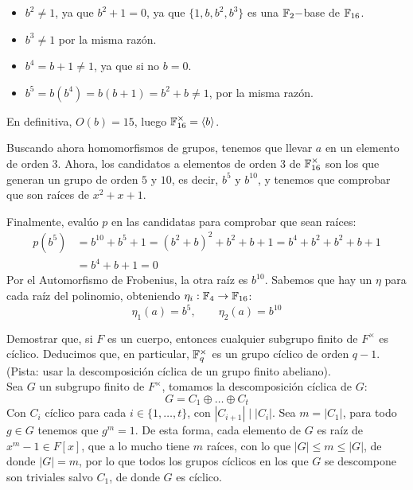 \begin{ejercicio}
    \begin{itemize}
        \item $b^2\neq 1$, ya que $b^2+1=0$, ya que $\{1,b,b^2, b^3\}$ es una $\mathbb{F}_2-$base de $\mathbb{F}_{16}$.
        \item $b^3\neq 1$ por la misma razón.
        \item $b^4 = b+1\neq 1$, ya que si no $b = 0$.
        \item $b^5 = b(b^4) = b(b+1) = b^2 + b \neq 1$, por la misma razón.
    \end{itemize}
    En definitiva, $O(b)=15$, luego $\mathbb{F}_{16}^{\times} = \langle b \rangle $.

    \noindent
    Buscando ahora homomorfismos de grupos, tenemos que llevar $a$ en un elemento de orden 3. Ahora, los candidatos a elementos de orden 3 de $\mathbb{F}_{16}^\times$ son los que generan un grupo de orden $5$ y $10$, es decir, $b^5$ y $b^{10}$, y tenemos que comprobar que son raíces de $x^2+x+1$.

    Finalmente, evalúo $p$ en las candidatas para comprobar que sean raíces:
    \begin{align*}
        p(b^5) &= b^{10} + b^{5} + 1 = {(b^2 + b)}^{2} + b^2 + b + 1 = b^4 + b^2 + b^2 + b + 1 \\
               &= b^4 + b + 1 = 0 
    \end{align*}
    Por el Automorfismo de Frobenius, la otra raíz es $b^{10}$. Sabemos que hay un $\eta$ para cada raíz del polinomio, obteniendo $\eta_i:\mathbb{F}_4\to \mathbb{F}_{16}$:
    \begin{equation*}
        \eta_1(a) = b^5, \qquad \eta_2(a) = b^{10}
    \end{equation*}
\end{ejercicio}


\begin{ejercicio}\label{ej:subgrupo_finito}
    Demostrar que, si $F$ es un cuerpo, entonces cualquier subgrupo finito de $F^\times$ es cíclico. Deducimos que, en particular, $\mathbb{F}_q^\times$ es un grupo cíclico de orden $q-1$. (Pista: usar la descomposición cíclica de un grupo finito abeliano).\\

    \noindent
    Sea $G$ un subgrupo finito de $F^\times$, tomamos la descomposición cíclica de $G$:
    \begin{equation*}
        G = C_1 \oplus \ldots \oplus C_t
    \end{equation*}
    Con $C_i$ cíclico para cada $i \in \{1,\ldots,t\}$, con $|C_{i+1}|\mid |C_i|$. Sea $m = |C_1|$, para todo $g\in G$ tenemos que $g^m = 1$. De esta forma, cada elemento de $G$ es raíz de $x^m-1\in F[x]$, que a lo mucho tiene $m$ raíces, con lo que $|G| \leq m\leq |G|$, de donde $|G| = m$, por lo que todos los grupos cíclicos en los que $G$ se descompone son triviales salvo $C_1$, de donde $G$ es cíclico.
\end{ejercicio}

